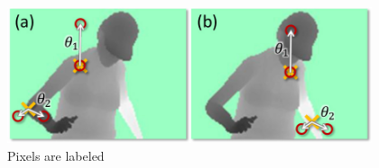 \begin{figure}
	[h] \centering 
	\includegraphics[height=4cm]{figures/content/ni-label.jpg} \caption{Pixels are labeled} \label{fg:ni:label} 
\end{figure}

